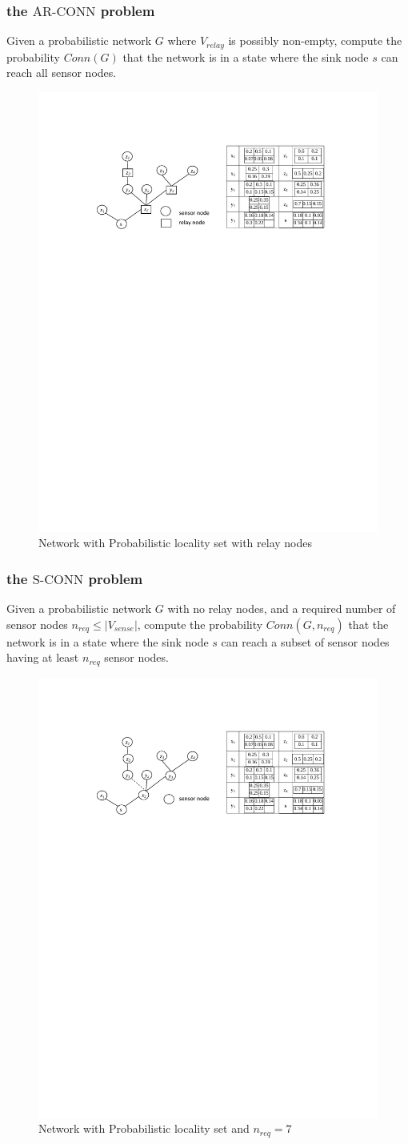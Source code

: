 \documentclass{beamer}
\newcommand{\SCONN}   { {\mathrm {S\mbox{-}CONN}} }
\newcommand{\ARCONN}   { {\mathrm {AR\mbox{-}CONN}} }
\begin{document}
\begin{frame}
\frametitle{the $\ARCONN$ problem}
\begin{definition}
\normalfont
Given a probabilistic network $G$ where $V_{relay}$ is possibly non-empty, compute the probability $Conn(G)$ that the network is in a state where the sink node $s$ can reach all sensor nodes. 
\end{definition}

\begin{figure}
\includegraphics[width=4 in, height=1.5 in]{ARCONN.pdf}
\caption{Network with Probabilistic locality set with relay nodes}
\end{figure}
\end{frame}

\begin{frame}
\frametitle{the $\SCONN$ problem}

\begin{definition}
Given a probabilistic network $G$ with no relay nodes, and a required number of sensor nodes $n_{req}\leq |V_{sense}|$, compute the probability $Conn(G,n_{req})$ that the network is in a state where the sink node $s$ can reach a subset of sensor nodes having at least $n_{req}$ sensor nodes. 
\end{definition}

\begin{figure}
\includegraphics[width=4 in, height=1.5 in]{SCONN.pdf}
\caption{Network with Probabilistic locality set and $n_{req}=7$}
\end{figure}
\end{frame}
\end{document}
